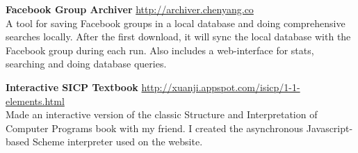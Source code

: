 \documentclass[9pt]{article}
\newenvironment{changemargin}[2]{%
  \begin{list}{}{%
      \setlength{\topsep}{0pt}%
      \setlength{\leftmargin}{#1}%
      \setlength{\rightmargin}{#2}%
      \setlength{\listparindent}{\parindent}%
      \setlength{\itemindent}{\parindent}%
      \setlength{\parsep}{\parskip}%
    }%
  \item[]}{\end{list}
}
\newenvironment{body} {
  \vspace*{-16pt}
  \begin{changemargin}{-0.25in}{-0.5in}
  }
  {\end{changemargin}
}
\begin{document}
\begin{body}
  \vspace{14pt}

  \textbf{Facebook Group Archiver} \hfill \url{http://archiver.chenyang.co}\\
  A tool for saving Facebook groups in a local database and doing comprehensive searches locally. After the first download, it will sync the local database with the Facebook group during each run. Also includes a web-interface for stats, searching and doing database queries. \\
  \medskip

  \textbf{Interactive SICP Textbook} \hfill \url{http://xuanji.appspot.com/isicp/1-1-elements.html}\\
  Made an interactive version of the classic Structure and Interpretation of Computer Programs book with my friend. I created the asynchronous Javascript-based Scheme interpreter used on the website.\\
  \medskip






\end{body}
\end{document}
